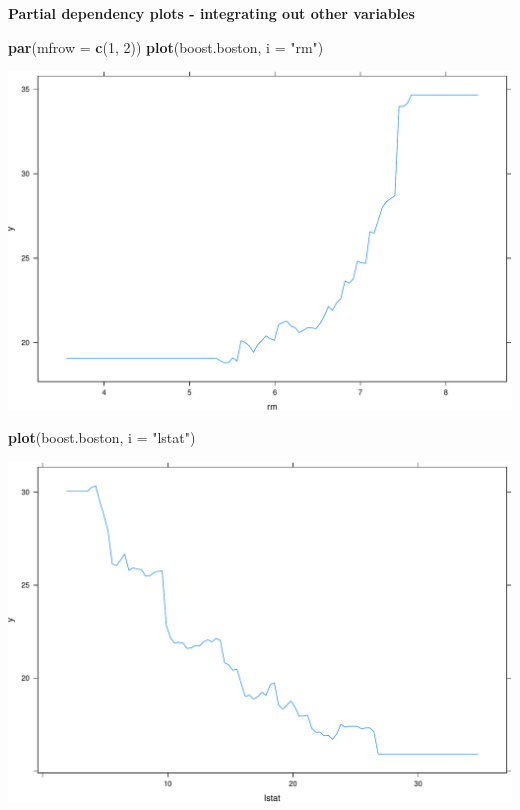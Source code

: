 \documentclass[ignorenonframetext,]{beamer}
\newenvironment{Shaded}{\begin{snugshade}}{\end{snugshade}}
\newcommand{\KeywordTok}[1]{\textcolor[rgb]{0.13,0.29,0.53}{\textbf{#1}}}
\newcommand{\DataTypeTok}[1]{\textcolor[rgb]{0.13,0.29,0.53}{#1}}
\newcommand{\DecValTok}[1]{\textcolor[rgb]{0.00,0.00,0.81}{#1}}
\newcommand{\StringTok}[1]{\textcolor[rgb]{0.31,0.60,0.02}{#1}}
\newcommand{\NormalTok}[1]{#1}
\begin{document}
\begin{frame}[fragile]

\textbf{Partial dependency plots - integrating out other variables }

\begin{Shaded}
\begin{Highlighting}[]
\KeywordTok{par}\NormalTok{(}\DataTypeTok{mfrow =} \KeywordTok{c}\NormalTok{(}\DecValTok{1}\NormalTok{, }\DecValTok{2}\NormalTok{))}
\KeywordTok{plot}\NormalTok{(boost.boston, }\DataTypeTok{i =} \StringTok{"rm"}\NormalTok{)}
\end{Highlighting}
\end{Shaded}

\includegraphics{8TreesBEAMER_files/figure-beamer/unnamed-chunk-48-1.pdf}

\begin{Shaded}
\begin{Highlighting}[]
\KeywordTok{plot}\NormalTok{(boost.boston, }\DataTypeTok{i =} \StringTok{"lstat"}\NormalTok{)}
\end{Highlighting}
\end{Shaded}

\includegraphics{8TreesBEAMER_files/figure-beamer/unnamed-chunk-48-2.pdf}

\end{frame}
\end{document}
